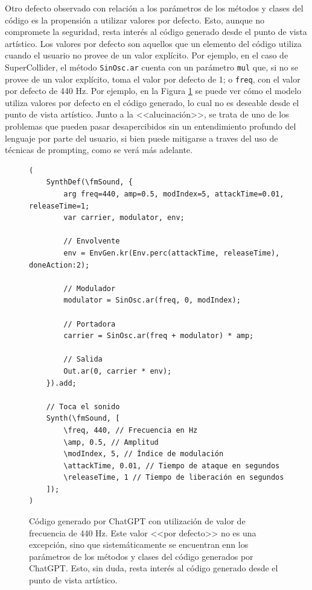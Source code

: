 Otro defecto observado con relación a los parámetros de los métodos y clases del código es la propensión a utilizar valores por defecto. Esto, aunque no compromete la seguridad, resta interés al código generado desde el punto de vista artístico. Los valores por defecto son aquellos que un elemento del código utiliza cuando el usuario no provee de un valor explícito. Por ejemplo, en el caso de SuperCollider, el método \texttt{SinOsc.ar} cuenta con un parámetro \texttt{mul} que, si no se provee de un valor explícito, toma el valor por defecto de 1; o \texttt{freq}, con el valor por defecto de 440 Hz. Por ejemplo, en la Figura \ref{fig:ChatGPT_valores_por_defecto} se puede ver cómo el modelo utiliza valores por defecto en el código generado, lo cual no es deseable desde el punto de vista artístico. Junto a la <<alucinación>>, se trata de uno de los problemas que pueden pasar desapercibidos sin un entendimiento profundo del lenguaje por parte del usuario, si bien puede mitigarse a traves del uso de técnicas de prompting, como se verá más adelante.

\begin{figure}[H]
    \caption[]{Código generado por ChatGPT con utilización de valor de frecuencia de 440 Hz. Este valor <<por defecto>> no es una excepción, sino que sistemáticamente se encuentran enn los parámetros de los métodos y clases del código generados por ChatGPT. Esto, sin duda, resta interés al código generado desde el punto de vista artístico.}
    \centering
    \begin{lstlisting}[style=SuperCollider-IDE, basicstyle=\footnotesize\ttfamily, numbers=none]
(
    SynthDef(\fmSound, {
        arg freq=440, amp=0.5, modIndex=5, attackTime=0.01, releaseTime=1;
        var carrier, modulator, env;
    
        // Envolvente
        env = EnvGen.kr(Env.perc(attackTime, releaseTime), doneAction:2);
    
        // Modulador
        modulator = SinOsc.ar(freq, 0, modIndex);
    
        // Portadora
        carrier = SinOsc.ar(freq + modulator) * amp;
    
        // Salida
        Out.ar(0, carrier * env);
    }).add;
    
    // Toca el sonido
    Synth(\fmSound, [
        \freq, 440, // Frecuencia en Hz
        \amp, 0.5, // Amplitud
        \modIndex, 5, // Índice de modulación
        \attackTime, 0.01, // Tiempo de ataque en segundos
        \releaseTime, 1 // Tiempo de liberación en segundos
    ]);
) 
    \end{lstlisting}
    \label{fig:ChatGPT_valores_por_defecto}
\end{figure}

